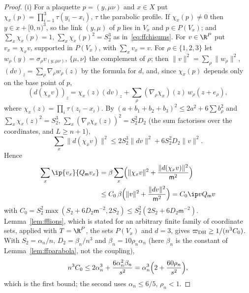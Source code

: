 \begin{proof}
(i) For a plaquette $p=(y,\mu\nu)$ and $x\in X$ put $\chi_x(p)=\prod_{i=1}^3
\tau(y_i-x_i)$, $\tau$ the parabolic profile. If $\chi_x(p)\ne0$ then $y\in x
+[0,n)^3$, so the link $(y,\mu)$ of $p$ lies in $V_x$ and $p\in P(V_x)$; and
$\sum_x\chi_x(p)=1$, $\sum_x\chi_x(p)^2=S_2^3$ as in~\eqref{eq:ffchisums}.
For $v\in\R^P$ put $v_x=\chi_xv$, supported in $P(V_x)$, with $\sum_xv_x=v$.
For $\rho\in\{1,2,3\}$ let $w_\rho(y)=\sigma_\rho v_{(y,\mu\nu)}$, $\{\mu,\nu\}$
the complement of $\rho$; then $\lVert v\rVert^2=\sum_\rho\lVert w_\rho
\rVert^2$, $(dv)_z=\sum_\rho\nabla_\rho w_\rho(z)$ by the formula for $d$,
and, since $\chi_x(p)$ depends only on the base point of $p$,
\[
(d(\chi_xv))_z=\chi_x(z)(dv)_z+\sum_\rho(\nabla_\rho\chi_x)(z)\,w_\rho(z+e_\rho),
\]
where $\chi_x(z)=\prod_i\tau(z_i-x_i)$. By $(a+b_1+b_2+b_3)^2\le2a^2+6\sum
b_\rho^2$ and $\sum_x\chi_x(z)^2=S_2^3$, $\sum_x(\nabla_\rho\chi_x(z))^2=
S_2^2D_2$ (the sum factorises over the coordinates, and $L\ge n+1$),
\[
\sum_x\lVert d(\chi_xv)\rVert^2\le2S_2^3\lVert dv\rVert^2+6S_2^2D_2\lVert v
\rVert^2 .
\]
Hence
\begin{align*}
\sum_x\ip{v_x}{Q_{\mathsf m}v_x}&=\beta\sum_x\Bigl(\lVert\chi_xv\rVert^2+\frac{
\lVert d(\chi_xv)\rVert^2}{\mathsf m^2}\Bigr)\\
&\le C_0\,\beta\Bigl(\lVert v
\rVert^2+\frac{\lVert dv\rVert^2}{\mathsf m^2}\Bigr)=C_0\ip v{Q_{\mathsf m}v}
\end{align*}
with $C_0=S_2^2\max(S_2+6D_2\mathsf m^{-2},2S_2)\le S_2^2(2S_2+6D_2\mathsf
m^{-2})$. Lemma~\ref{lem:fflions}, which is stated for an arbitrary finite
family of coordinate sets, applied with $T=\R^P$, the sets $P(V_x)$ and
$d=3$, gives $\varpi_{\rm DH}\ge1/(n^3C_0)$. With $S_2=\alpha_n/n$, $D_2=
\beta_n/n^3$ and $\beta_n=10\rho_n\alpha_n$ (here $\beta_n$ is the constant
of Lemma~\ref{lem:ffparabola}, not the coupling),
\[
n^3C_0\le2\alpha_n^3+\frac{6\alpha_n^2\beta_n}{s^2}=\alpha_n^3\Bigl(2+\frac{60
\rho_n}{s^2}\Bigr),
\]
which is the first bound; the second uses $\alpha_n\le6/5$, $\rho_n<1$.


\end{proof}
